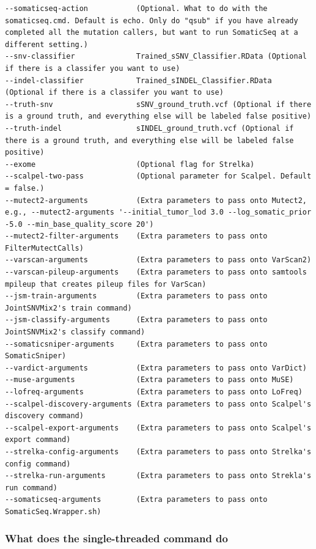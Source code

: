 \documentclass[10pt,letterpaper]{article}
\begin{document}
\begin{sloppypar}
\begin{lstlisting}
--somaticseq-action           (Optional. What to do with the somaticseq.cmd. Default is echo. Only do "qsub" if you have already completed all the mutation callers, but want to run SomaticSeq at a different setting.)
--snv-classifier              Trained_sSNV_Classifier.RData (Optional if there is a classifer you want to use)
--indel-classifier            Trained_sINDEL_Classifier.RData (Optional if there is a classifer you want to use)
--truth-snv                   sSNV_ground_truth.vcf (Optional if there is a ground truth, and everything else will be labeled false positive)
--truth-indel                 sINDEL_ground_truth.vcf (Optional if there is a ground truth, and everything else will be labeled false positive)
--exome                       (Optional flag for Strelka)
--scalpel-two-pass            (Optional parameter for Scalpel. Default = false.)
--mutect2-arguments           (Extra parameters to pass onto Mutect2, e.g., --mutect2-arguments '--initial_tumor_lod 3.0 --log_somatic_prior -5.0 --min_base_quality_score 20')
--mutect2-filter-arguments    (Extra parameters to pass onto FilterMutectCalls)
--varscan-arguments           (Extra parameters to pass onto VarScan2)
--varscan-pileup-arguments    (Extra parameters to pass onto samtools mpileup that creates pileup files for VarScan)
--jsm-train-arguments         (Extra parameters to pass onto JointSNVMix2's train command)
--jsm-classify-arguments      (Extra parameters to pass onto JointSNVMix2's classify command)
--somaticsniper-arguments     (Extra parameters to pass onto SomaticSniper)
--vardict-arguments           (Extra parameters to pass onto VarDict)
--muse-arguments              (Extra parameters to pass onto MuSE)
--lofreq-arguments            (Extra parameters to pass onto LoFreq)
--scalpel-discovery-arguments (Extra parameters to pass onto Scalpel's discovery command)
--scalpel-export-arguments    (Extra parameters to pass onto Scalpel's export command)
--strelka-config-arguments    (Extra parameters to pass onto Strelka's config command)
--strelka-run-arguments       (Extra parameters to pass onto Strekla's run command)
--somaticseq-arguments        (Extra parameters to pass onto SomaticSeq.Wrapper.sh)
\end{lstlisting}



\subsubsection{What does the single-threaded command do}


\end{sloppypar}
\end{document}
